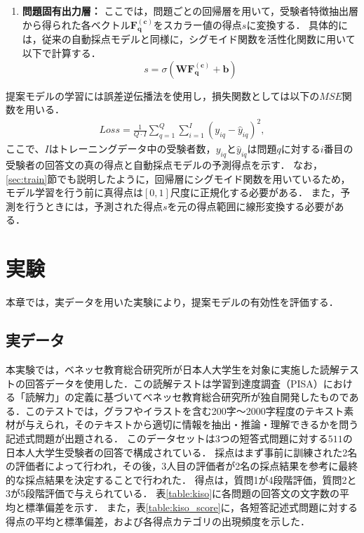 \documentclass[a4paper,12pt,oneside,openany]{jsbook}
\begin{document}
\begin{enumerate}
\item {\bf 問題固有出力層：} ここでは，問題ごとの回帰層を用いて，受験者特徴抽出層から得られた各ベクトル$\bm{F^{(c)}_q}$をスカラー値の得点$s$に変換する．
具体的には，従来の自動採点モデルと同様に，シグモイド関数を活性化関数に用いて以下で計算する．
\begin{equation}
s=\sigma(\mathbf{W}\bm{F^{(c)}_q}+\mathbf{b})
\end{equation}
\end{enumerate}

提案モデルの学習には誤差逆伝播法を使用し，損失関数としては以下の$MSE$関数を用いる．
\begin{eqnarray} 
Loss =\frac{1}{Q\cdot I}\sum_{q=1}^Q \sum_{i=1}^I (y_{iq}-\hat{y}_{iq})^2, 
\end{eqnarray}
ここで、$I$はトレーニングデータ中の受験者数，$y_{iq}$と$\hat{y}_{iq}$は問題$q$に対する$i$番目の受験者の回答文の真の得点と自動採点モデルの予測得点を示す．
なお，\ref{sec:train}節でも説明したように，回帰層にシグモイド関数を用いているため，モデル学習を行う前に真得点は$[0, 1]$尺度に正規化する必要がある．
また，予測を行うときには，予測された得点$s$を元の得点範囲に線形変換する必要がある．

\chapter{実験}

本章では，実データを用いた実験により，提案モデルの有効性を評価する．

\section{実データ}\label{sec:actdata}

本実験では，ベネッセ教育総合研究所が日本人大学生を対象に実施した読解テストの回答データを使用した．この読解テストは学習到達度調査（PISA）における「読解力」の定義に基づいてベネッセ教育総合研究所が独自開発したものである．このテストでは，グラフやイラストを含む200字〜2000字程度のテキスト素材が与えられ，そのテキストから適切に情報を抽出・推論・理解できるかを問う記述式問題が出題される．
このデータセットは3つの短答式問題に対する$511$の日本人大学生受験者の回答で構成されている．
採点はまず事前に訓練された2名の評価者によって行われ，その後，3人目の評価者が2名の採点結果を参考に最終的な採点結果を決定することで行われた．
得点は，質問1が4段階評価，質問2と3が5段階評価で与えられている．
表\ref{table:kiso}に各問題の回答文の文字数の平均と標準偏差を示す．
また，表\ref{table:kiso_score}に，各短答記述式問題に対する得点の平均と標準偏差，および各得点カテゴリの出現頻度を示した．
\end{document}
